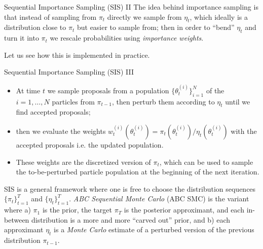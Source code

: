 \documentclass{beamer}
\theoremstyle{remark}
\begin{document}
\begin{frame}{Sequential Importance Sampling (SIS) II}
The idea behind importance sampling is that instead of sampling from $\pi_t$ directly we sample from $\eta_t$, which ideally is a distribution close to $\pi_t$ but easier to sample from; then in order to ``bend'' $\eta_t$ and turn it into $\pi_t$ we rescale probabilities using \emph{importance weights}.


Let us see how this is implemented in practice.
\end{frame}
\begin{frame}{Sequential Importance Sampling (SIS) III}
\begin{itemize}[<+->]
    \item At time $t$ we sample proposals from a population $\{\theta_t^{(i)}\}_{i=1}^N$ of the $i=1, \dots, N$ particles from $\pi_{t-1}$, then perturb them according to $\eta_t$ until we find accepted proposals;
    \item then we evaluate the weights $w_t^{(i)}(\theta_t^{(i)})=\pi_t(\theta_t^{(i)})/\eta_t(\theta_t^{(i)})$ with the accepted proposals i.e. the updated population.
    \item These weights are the discretized version of $\pi_t$, which can be used to sample the to-be-perturbed particle population at the beginning of the next iteration.
\end{itemize}
\pause[\thebeamerpauses]
SIS is a general framework where one is free to choose the distribution sequences $\{\pi_t\}_{t=1}^T$ and $\{\eta_t\}_{t=1}^T$. \emph{ABC Sequential Monte Carlo} (ABC SMC) is the variant where a) $\pi_1$ is the prior, the target $\pi_T$ is the posterior approximant, and each in-between distribution is a more and more ``carved out'' prior, and b) each approximant $\eta_t$ is a \emph{Monte Carlo} estimate of a perturbed version of the previous distribution $\pi_{t-1}$.
\end{frame}
\end{document}
